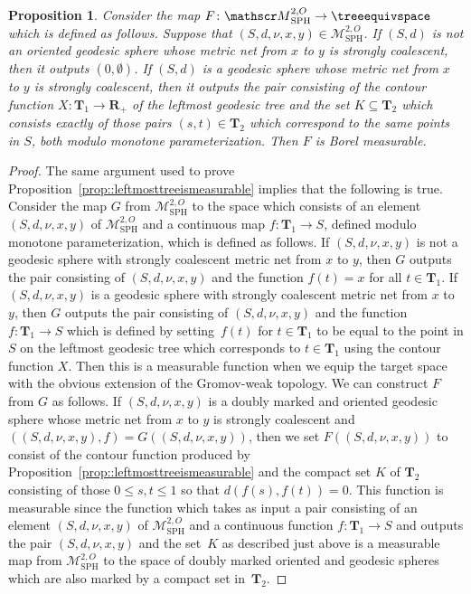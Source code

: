 \documentclass[JEP,XML,SOM,Unicode]{cedram}
\let\mathcal\mathscr
\theoremstyle{plain}
\numberwithin{theorem}{section}
\newtheorem{proposition}[theorem]{Proposition}
\theoremstyle{definition}
\newcommand\gmsspace{{\mathcal M}_{\mathrm{SPH}}}
\newcommand{\R}{\mathbf{R}}
\newcommand{\T}{\mathbf{T}}
\begin{document}
\begin{proposition}
\label{prop:equiv_measurable}
Consider the map $F \colon \gmsspace^{2,O} \to \treeequivspace$ which is defined as follows. Suppose that $(S,d,\nu,x,y) \in \gmsspace^{2,O}$. If $(S,d)$ is not an oriented geodesic sphere whose metric net from $x$ to $y$ is strongly coalescent, then it outputs $(0,\emptyset)$. If $(S,d)$ is a geodesic sphere whose metric net from $x$ to $y$ is strongly coalescent, then it outputs the pair consisting of the contour function $X \colon \T_1 \to \R_+$ of the leftmost geodesic tree and the set $K \subseteq \T_2$ which consists exactly of those pairs $(s,t) \in \T_2$ which correspond to the same points in $S$, both modulo monotone parameterization. Then $F$ is Borel measurable.
\end{proposition}
\begin{proof}
The same argument used to prove Proposition~\ref{prop::leftmosttreeismeasurable} implies that the following is true. Consider the map $G$ from $\gmsspace^{2,O}$ to the space which consists of an element $(S,d,\nu,x,y)$ of $\gmsspace^{2,O}$ and a continuous map $f \colon \T_1 \to S$, defined modulo monotone parameterization, which is defined as follows. If $(S,d,\nu,x,y)$ is not a geodesic sphere with strongly coalescent metric net from $x$ to $y$, then $G$ outputs the pair consisting of $(S,d,\nu,x,y)$ and the function $f(t) = x$ for all $t \in \T_1$. If $(S,d,\nu,x,y)$ is a geodesic sphere with strongly coalescent metric net from $x$ to $y$, then $G$ outputs the pair consisting of $(S,d,\nu,x,y)$ and the function $f \colon \T_1 \to S$ which is defined by setting~$f(t)$ for $t \in \T_1$ to be equal to the point in $S$ on the leftmost geodesic tree which corresponds to $t \in \T_1$ using the contour function $X$. Then this is a measurable function when we equip the target space with the obvious extension of the Gromov-weak topology. We can construct $F$ from $G$ as follows. If $(S,d,\nu,x,y)$ is a doubly marked and oriented geodesic sphere whose metric net from $x$ to $y$ is strongly coalescent and $((S,d,\nu,x,y),f) = G((S,d,\nu,x,y))$, then we set $F( (S,d,\nu,x,y))$ to consist of the contour function produced by Proposition~\ref{prop::leftmosttreeismeasurable} and the compact set $K$ of $\T_2$ consisting of those $0 \leq s,t \leq 1$ so that $d(f(s),f(t)) = 0$. This function is measurable since the function which takes as input a pair consisting of an element $(S,d,\nu,x,y)$ of $\gmsspace^{2,O}$ and a continuous function $f \colon \T_1 \to S$ and outputs the pair $(S,d,\nu,x,y)$ and the set~$K$ as described just above is a measurable map from $\gmsspace^{2,O}$ to the space of doubly marked oriented and geodesic spheres which are also marked by a compact set in~$\T_2$.
\end{proof}
\end{document}
